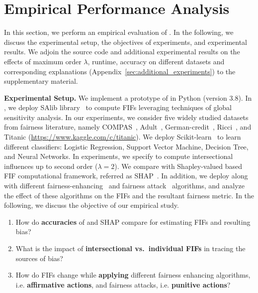 \section{Empirical Performance Analysis}\label{sec:experiments}
In this section, we perform an empirical evaluation of {\fairXplainer}. In the following, we discuss the experimental setup, the objectives of experiments, and experimental results. { We adjoin the source code and additional experimental results on the effects of maximum order $\lambda$, runtime, accuracy on different datasets and corresponding explanations (Appendix~\ref{sec:additional_experiments}) to the supplementary material.}

\noindent\textbf{Experimental Setup.} We implement a prototype of {\fairXplainer} in Python (version $ 3.8 $). In {\fairXplainer}, we deploy SAlib library~\cite{Herman2017} to compute FIFs leveraging techniques of global sensitivity analysis. In our experiments, we consider five widely studied datasets from fairness literature, namely COMPAS~\cite{angwin2016machine}, Adult~\cite{DK2017uci}, German-credit~\cite{DK2017}, Ricci~\cite{mcginley2010ricci}, and Titanic (\url{https://www.kaggle.com/c/titanic}). We deploy Scikit-learn~\cite{scikit-learn} to learn different classifiers: Logistic Regression, Support Vector Machine, Decision Tree, and Neural Networks. In experiments, we specify {\fairXplainer} to compute intersectional influences up to second order ($ \lambda = 2 $). We compare {\fairXplainer} with Shapley-valued based FIF computational framework, referred as SHAP~\cite{lundberg2020explaining}. In addition, we deploy {\fairXplainer} along with different fairness-enhancing~\cite{kamiran2012data} and fairness attack~\cite{solans2020poisoning} algorithms, and analyze the effect of these algorithms on the FIFs and the resultant fairness metric. In the following, we discuss the objective of our empirical study. 
\begin{enumerate}[nosep,leftmargin=*]
	\item How do \textbf{accuracies} of {\fairXplainer} and SHAP compare for estimating FIFs and resulting bias?
	\item What is the impact of\textbf{ intersectional vs.\ individual FIFs} in tracing the sources of bias?
    \item How do FIFs change while \textbf{applying} different fairness enhancing algorithms, i.e. \textbf{affirmative actions}, and fairness attacks, i.e. \textbf{punitive actions}?
\end{enumerate}
